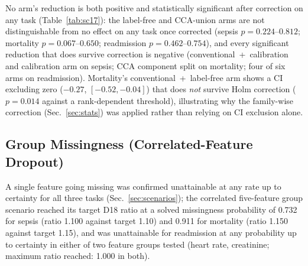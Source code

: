 \documentclass[preprintsapa,article,submit,oneauthor]{Definitions/mdpi}
\begin{document}
No arm's reduction is both positive and statistically significant after correction on any task (Table~\ref{tab:sc17}): the label-free and CCA-union arms are not distinguishable from no effect on any task once corrected (sepsis $p=0.224$--$0.812$; mortality $p=0.067$--$0.650$; readmission $p=0.462$--$0.754$), and every significant reduction that does survive correction is negative (conventional~+~calibration and calibration arm on sepsis; CCA component split on mortality; four of six arms on readmission). Mortality's conventional~+~label-free arm shows a CI excluding zero ($-0.27$, $[-0.52,-0.04]$) that does \emph{not} survive Holm correction ($p=0.014$ against a rank-dependent threshold), illustrating why the family-wise correction (Sec.~\ref{sec:stats}) was applied rather than relying on CI exclusion alone.

\subsection{Group Missingness (Correlated-Feature Dropout)}\label{sec:results-missingness}

A single feature going missing was confirmed unattainable at any rate up to certainty for all three tasks (Sec.~\ref{sec:scenarios}); the correlated five-feature group scenario reached its target D18 ratio at a solved missingness probability of 0.732 for sepsis (ratio 1.100 against target 1.10) and 0.911 for mortality (ratio 1.150 against target 1.15), and was unattainable for readmission at any probability up to certainty in either of two feature groups tested (heart rate, creatinine; maximum ratio reached: 1.000 in both).
\end{document}
